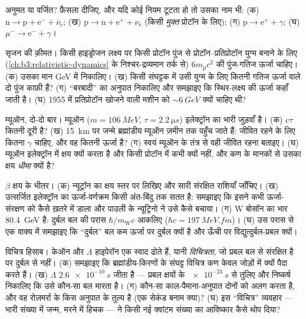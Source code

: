 \begin{exercise}[$\star$]\label{exo:b3:particle-physics:3}
अनुमत या वर्जित? फ़ैसला दीजिए, और यदि कोई नियम टूटता हो तो उसका नाम भी:
(क) $\text{n} \to \text{p} + \text{e}^- + \bar\nu_{\text{e}}$;
(ख) $\text{p} \to \text{n} + \text{e}^+ + \nu_{\text{e}}$ (किसी
\emph{मुक्त} प्रोटॉन के लिए);
(ग) $\text{p} \to \text{e}^+ + \gamma$;
(घ) $\mu^- \to \text{e}^- + \gamma$।
\end{exercise}

\begin{exercise}[$\star$]\label{exo:b3:particle-physics:4}
सृजन की क़ीमत। किसी हाइड्रोजन लक्ष्य पर किसी प्रोटॉन पुंज से
प्रोटॉन--प्रतिप्रोटॉन युग्म बनाने के लिए
(\cref{ch:b3:relativistic-dynamics} के निश्चर-द्रव्यमान तर्क से)
$6m_{\text{p}}c^2$ की पुंज-गतिज ऊर्जा चाहिए। (क) उसका मान GeV में निकालिए।
(ख) किसी संघट्टक में उसी युग्म के लिए कितनी गतिज ऊर्जा वाले दो पुंज
काफ़ी हैं? (ग) ``बरबादी'' का अनुपात निकालिए और समझाइए कि
स्थिर-लक्ष्य की ऊर्जा कहाँ जाती है। (घ) 1955 में प्रतिप्रोटॉन खोजने
वाली मशीन को $\sim\qty{6}{GeV}$ क्यों चाहिए थी?
\end{exercise}

\begin{exercise}[$\star\star$]\label{exo:b3:particle-physics:5}
म्यूऑन, दो-दो बार। म्यूऑन ($m = \qty{106}{MeV}$,
$\tau = \qty{2.2}{\micro s}$) इलेक्ट्रॉन का भारी जुड़वाँ है। (क)
$c\tau$ कितनी दूरी है? (ख) \qty{15}{km} पर जन्मे ब्रह्मांडीय
म्यूऑन ज़मीन तक पहुँच जाते हैं: जीवित रहने के लिए कितना $\gamma$
चाहिए, और वह कितनी ऊर्जा है? (ग) स्वयं म्यूऑन के तंत्र से वही
जीवित रहना बताइए। (घ) म्यूऑन इलेक्ट्रॉन में क्षय क्यों करता है और
किसी प्रोटॉन में कभी क्यों नहीं, और कण के मानकों से उसका क्षय
\emph{धीमा} क्यों है?
\end{exercise}

\begin{exercise}[$\star\star$]\label{exo:b3:particle-physics:6}
$\beta$ क्षय के भीतर। (क) न्यूट्रॉन का क्षय 
स्तर पर लिखिए और सारी संरक्षित राशियाँ जाँचिए। (ख) उत्सर्जित
इलेक्ट्रॉन का ऊर्जा-वर्णक्रम किसी अंत-बिंदु तक सतत है:
समझाइए कि इसने कभी ऊर्जा-संरक्षण को कैसे ख़तरे में डाला और
पाउली के न्यूट्रिनो ने उसे कैसे बचाया। (ग) W बोसॉन का भार
\qty{80.4}{GeV} है: दुर्बल बल की परास
$\hbar/m_{\text{W}}c$ आकलिए ($\hbar c = \qty{197}{MeV.fm}$)। (घ) उस
परास से एक वाक्य में समझाइए कि ``दुर्बल'' बल कम ऊर्जा पर दुर्बल
क्यों है और ऊँची पर विद्युत्दुर्बल-प्रबल क्यों।
\end{exercise}

\begin{exercise}[$\star\star$]\label{exo:b3:particle-physics:7}
विचित्र हिसाब। केऑन और $\Lambda$ हाइपेरॉन एक स्वाद ढोते हैं,
यानी \emph{विचित्रता}, जो प्रबल बल से संरक्षित है पर
दुर्बल से नहीं। (क) समझाइए कि ब्रह्मांडीय-किरणों के संघट्ट विचित्र
कण केवल जोड़ों में क्यों पैदा करते हैं। (ख) $\Lambda$
$\qty{2.6e-10}{s}$ जीता है --- प्रबल क्षयों के $\qty{e-23}{s}$ से
तुलिए और निष्कर्ष निकालिए कि उसे कौन-सा बल मारता है। (ग) कौन-सा
काल-पैमाना-अनुपात दोनों को अलग करता है, और वह रोज़मर्रा के किस
अनुपात के तुल्य है (एक सेकंड बनाम क्या)? (घ) इस ``विचित्र'' व्यवहार
--- भारी संख्या में जन्म, मरने में हिचक --- ने किसी नई क्वांटम
संख्या का आविष्कार कैसे थोप दिया?
\end{exercise}

